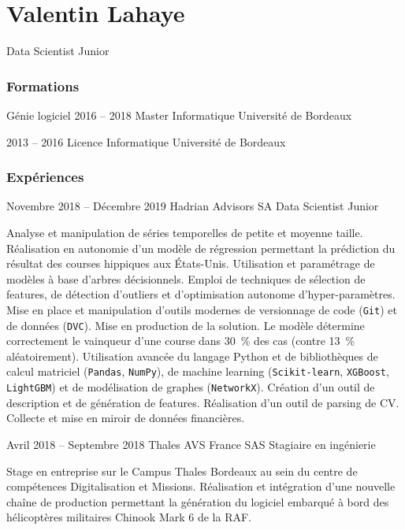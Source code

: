 \documentclass{tccv}
\begin{document}
\part{Valentin Lahaye}{Data Scientist Junior}

\section{Formations}
\begin{yearlist}

\item[Génie logiciel]{2016 -- 2018}
     {Master Informatique}
     {Université de Bordeaux}

\item{2013 -- 2016}
     {Licence Informatique}
     {Université de Bordeaux}

\end{yearlist}

\section{Expériences}
\begin{eventlist}

\item{Novembre 2018 -- Décembre 2019}
     {Hadrian Advisors SA}
     {Data Scientist Junior}

Analyse et manipulation de séries temporelles de petite et moyenne taille. Réalisation en autonomie d'un modèle de régression permettant la prédiction du résultat des courses hippiques aux \'Etats-Unis. Utilisation et paramétrage de modèles à base d'arbres décisionnels. Emploi de techniques de sélection de features, de détection d'outliers et d'optimisation autonome d'hyper-paramètres. Mise en place et manipulation d'outils modernes de versionnage de code (\texttt{Git}) et de données (\texttt{DVC}). Mise en production de la solution. Le modèle détermine correctement le vainqueur d'une course dans 30~\% des cas (contre 13~\% aléatoirement). Utilisation avancée du langage Python et de bibliothèques de calcul matriciel (\texttt{Pandas}, \texttt{NumPy}), de machine learning (\texttt{Scikit-learn}, \texttt{XGBoost}, \texttt{LightGBM}) et de modélisation de graphes (\texttt{NetworkX}). Création d'un outil de description et de génération de features. Réalisation d'un outil de parsing de CV. Collecte et mise en miroir de données financières.

\item{Avril 2018 -- Septembre 2018}
     {Thales AVS France SAS}
     {Stagiaire en ingénierie}

Stage en entreprise sur le Campus Thales Bordeaux au sein du centre de compétences Digitalisation et Missions. Réalisation et intégration d'une nouvelle\\ chaîne de production permettant la génération du logiciel embarqué à bord des hélicoptères militaires Chinook Mark 6 de la RAF.

\end{eventlist}
\end{document}
